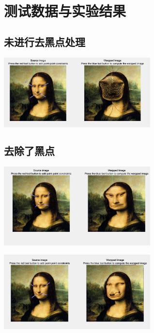 \documentclass{article}
\begin{document}
\section{测试数据与实验结果}
\subsection{未进行去黑点处理}



\includegraphics[width=0.6\textwidth]{1}


\subsection{去除了黑点}

\includegraphics[width=0.6\textwidth]{3}

\includegraphics[width=0.6\textwidth]{2}
\end{document}
